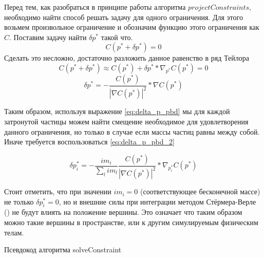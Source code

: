 	Перед тем, как разобраться в принципе работы алгоритма  $projectConstraints$, необходимо найти способ решать задачу для одного ограничения. Для этого возьмем произвольное ограничение и обозначим функцию этого ограничения как $C$. Поставим задачу найти $\delta p^*$ такой что.
	\begin{equation}
		C(p^* + \delta p^*) = 0
	\end{equation}
	Сделать это несложно, достаточно разложить данное равенство в ряд Тейлора
	\begin{equation}
		C(p^* + \delta p^*) \approx C(p^*) + \delta p^* * \nabla_{p^*} C(p^*) = 0
	\end{equation}
	\begin{equation} \label{eq:delta_p_pbd}
		\delta p^* = -\frac{C(p^*)}{|\nabla C(p^*)|^2} * \nabla C(p^*)
	\end{equation}
	
	Таким образом, используя выражение \ref{eq:delta_p_pbd} мы для каждой затронутой частицы можем найти смещение необходимое для удовлетворения данного ограничения, но только в случае если массы частиц равны между собой. Иначе требуется воспользоваться \ref{eq:delta_p_pbd_2}
	
	\begin{equation} \label{eq:delta_p_pbd_2}
		\delta p^*_i = - \frac{im_i}{\sum_l im_l} \frac{C(p^*)}{|\nabla C(p^*)|^2} * \nabla_{p^*_i} C(p^*)
	\end{equation}

	Стоит отметить, что при значении $im_i = 0$ (соответствующее бесконечной массе) не только $\delta p^*_i = 0$, но и внешние силы при интеграции методом Стёрмера-Верле () не будут влиять на положение вершины. Это означает что таким образом можно  такие вершины в пространстве, или  к другим симулируемым физическим телам.
	
	\begin{algorithm} %
		\nonl{}
		\caption{Псевдокод алгоритма solveConstraint}\label{alg:SolveConstraint}
	\end{algorithm}
	\FloatBarrier
	
